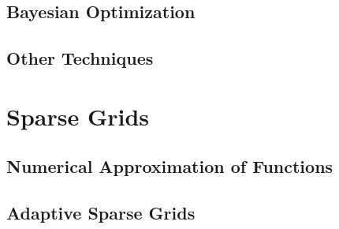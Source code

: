 \subsection{Bayesian Optimization}

\subsection{Other Techniques}


\section{Sparse Grids}

\subsection{Numerical Approximation of Functions}

\subsection{Adaptive Sparse Grids}
